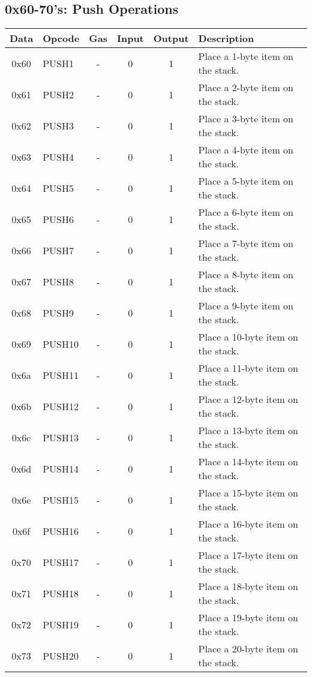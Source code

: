 \documentclass[10pt,a4paper,leqno,bibliography=totoc]{scrartcl}
\newenvironment{alphafootnotes}
{\par\edef\savedfootnotenumber{\number\value{footnote}}
\renewcommand{\thefootnote}{\alph{footnote}}
\setcounter{footnote}{0}}
{\par\setcounter{footnote}{\savedfootnotenumber}}
\begin{document}
\begin{alphafootnotes}
		\subsection{0x60-70's: Push Operations}
			\begin{longtable}{|cP{2.8cm}cccp{6cm}|}
        		\hline
        		\textbf{Data} & \textbf{Opcode} & \textbf{Gas}  & \textbf{Input}  & \textbf{Output} & \textbf{Description} \\
        		\hline
			0x60 & PUSH1 & - & 0 & 1 & Place a 1-byte item on the stack. \\
			0x61 & PUSH2 & - & 0 & 1 & Place a 2-byte item on the stack. \\
			0x62 & PUSH3 & - & 0 & 1 & Place a 3-byte item on the stack. \\
			0x63 & PUSH4 & - & 0 & 1 & Place a 4-byte item on the stack. \\
			0x64 & PUSH5 & - & 0 & 1 & Place a 5-byte item on the stack. \\
			0x65 & PUSH6 & - & 0 & 1 & Place a 6-byte item on the stack. \\
			0x66 & PUSH7 & - & 0 & 1 & Place a 7-byte item on the stack. \\
			0x67 & PUSH8 & - & 0 & 1 & Place a 8-byte item on the stack. \\
			0x68 & PUSH9 & - & 0 & 1 & Place a 9-byte item on the stack. \\
			0x69 & PUSH10 & - & 0 & 1 & Place a 10-byte item on the stack. \\
			0x6a & PUSH11 & - & 0 & 1 & Place a 11-byte item on the stack. \\
			0x6b & PUSH12 & - & 0 & 1 & Place a 12-byte item on the stack. \\
			0x6c & PUSH13 & - & 0 & 1 & Place a 13-byte item on the stack. \\
			0x6d & PUSH14 & - & 0 & 1 & Place a 14-byte item on the stack. \\
			0x6e & PUSH15 & - & 0 & 1 & Place a 15-byte item on the stack. \\
			0x6f & PUSH16 & - & 0 & 1 & Place a 16-byte item on the stack. \\
			0x70 & PUSH17 & - & 0 & 1 & Place a 17-byte item on the stack. \\
			0x71 & PUSH18 & - & 0 & 1 & Place a 18-byte item on the stack. \\
			0x72 & PUSH19 & - & 0 & 1 & Place a 19-byte item on the stack. \\
			0x73 & PUSH20 & - & 0 & 1 & Place a 20-byte item on the stack. \\

\end{longtable}
\end{alphafootnotes}
\end{document}
